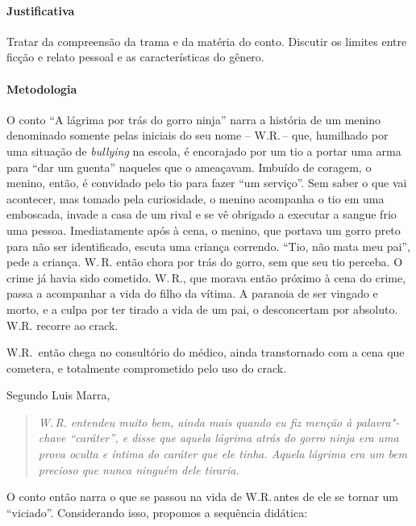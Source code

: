 \documentclass[12pt]{extarticle}
\begin{document}
\paragraph{Justificativa} Tratar da compreensão da trama e da matéria do conto. 
Discutir os limites entre ficção e relato pessoal e as características do 
gênero. 

\paragraph{Metodologia}
 O conto ``A lágrima por trás do gorro ninja'' narra a história de um menino denominado 
 somente pelas iniciais do seu nome -- W.R.\,-- que, 
 humilhado por uma situação de \textit{bullying} na escola, é encorajado por um tio
 a portar uma arma para ``dar um guenta'' naqueles que o ameaçavam. Imbuído de coragem, 
 o menino, então, é convidado pelo tio para fazer ``um serviço''. Sem saber o que vai 
 acontecer, mas tomado pela curiosidade, o menino acompanha o tio em uma emboscada, 
 invade a casa de um rival e se vê obrigado a executar a sangue frio uma pessoa. 
 Imediatamente após à cena, o menino, que portava um gorro preto para não ser 
 identificado, escuta uma criança correndo. ``Tio, não mata meu pai'', pede 
 a criança. W.\,R. então chora por trás do gorro, sem que seu tio perceba. 
 O crime já havia sido cometido. W.\,R., que morava então próximo 
 à cena do crime, passa a acompanhar a vida do filho da vítima. A paranoia de ser vingado
 e morto, e a culpa por ter tirado a vida de um pai, o desconcertam por absoluto. 
 W.R. recorre ao crack. 

 W.R.~então chega no consultório do médico, 
 ainda transtornado com a cena que cometera, e totalmente comprometido pelo 
 uso do crack. 

  Segundo Luis Marra, 
\begin{quote}
\textit{W.\,R. entendeu muito bem, ainda mais quando eu fiz menção à palavra"-chave
``caráter'', e disse que aquela lágrima atrás do gorro ninja era uma
prova oculta e íntima do caráter que ele tinha. Aquela lágrima era um
bem precioso que nunca ninguém dele tiraria.}
\end{quote}

O conto então narra o que se passou na vida de W.R.\,antes de ele se tornar 
um ``viciado''. Considerando isso, propomos a sequência didática:  
\end{document}
